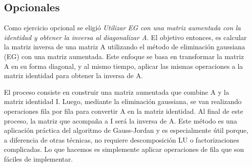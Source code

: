 \subsection{Opcionales}
\label{opcionales}

Como ejercicio opcional se eligió \textit{Utilizar EG con una matriz aumentada con la identidad y obtener la inversa al diagonalizar A}.
El objetivo entonces, es calcular la matriz inversa de una matriz A utilizando el método de eliminación gaussiana (EG) con una matriz aumentada. Este enfoque se basa en transformar la matriz A en su forma diagonal, y al mismo tiempo, aplicar las mismas operaciones a la matriz identidad para obtener la inversa de A.

El proceso consiste en construir una matriz aumentada que combine A y la matriz identidad I. Luego, mediante la eliminación gaussiana, se van realizando operaciones fila por fila para convertir A en la matriz identidad. Al final de este proceso, la matriz que acompaña a I será la inversa de A.
Este método es una aplicación práctica del algoritmo de Gauss-Jordan y es especialmente útil porque, a diferencia de otras técnicas, no requiere descomposición LU o factorizaciones complicadas. Lo que hacemos es simplemente aplicar operaciones de fila que son fáciles de implementar.